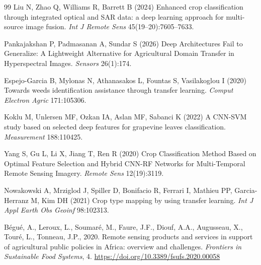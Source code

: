 \documentclass[pdflatex,sn-mathphys]{sn-jnl} %
\begin{document}
\begin{thebibliography}{99}
Liu N, Zhao Q, Williams R, Barrett B (2024) Enhanced crop classification through integrated optical and SAR data: a deep learning approach for multi-source image fusion. \textit{Int J Remote Sens} 45(19--20):7605--7633.

Pankajakshan P, Padmasanan A, Sundar S (2026) Deep Architectures Fail to Generalize: A Lightweight Alternative for Agricultural Domain Transfer in Hyperspectral Images. \textit{Sensors} 26(1):174.

Espejo-Garcia B, Mylonas N, Athanasakos L, Fountas S, Vasilakoglou I (2020) Towards weeds identification assistance through transfer learning. \textit{Comput Electron Agric} 171:105306.

Koklu M, Unlersen MF, Ozkan IA, Aslan MF, Sabanci K (2022) A CNN-SVM study based on selected deep features for grapevine leaves classification. \textit{Measurement} 188:110425.

Yang S, Gu L, Li X, Jiang T, Ren R (2020) Crop Classification Method Based on Optimal Feature Selection and Hybrid CNN-RF Networks for Multi-Temporal Remote Sensing Imagery. \textit{Remote Sens} 12(19):3119.

Nowakowski A, Mrziglod J, Spiller D, Bonifacio R, Ferrari I, Mathieu PP, Garcia-Herranz M, Kim DH (2021) Crop type mapping by using transfer learning. \textit{Int J Appl Earth Obs Geoinf} 98:102313.

Bégué, A., Leroux, L., Soumaré, M., Faure, J.F., Diouf, A.A., Augusseau, X., Touré, L., Tonneau, J.P., 2020. Remote sensing products and services in support of agricultural public policies in Africa: overview and challenges. \textit{Frontiers in Sustainable Food Systems}, 4. \href{https://doi.org/10.3389/fsufs.2020.00058}{https://doi.org/10.3389/fsufs.2020.00058}

\end{thebibliography}
\end{document}
